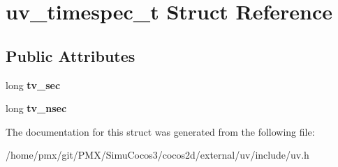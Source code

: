 \hypertarget{structuv__timespec__t}{}\section{uv\+\_\+timespec\+\_\+t Struct Reference}
\label{structuv__timespec__t}
\subsection*{Public Attributes}
\begin{DoxyCompactItemize}
\item 
\mbox{\label{structuv__timespec__t_a6c1e6a2cd2d9f10dc4df27ab3a79bc9d}} 
long {\bfseries tv\+\_\+sec}
\item 
\mbox{\label{structuv__timespec__t_af1552c618f27286c9734be801d0ecf3f}} 
long {\bfseries tv\+\_\+nsec}
\end{DoxyCompactItemize}


The documentation for this struct was generated from the following file\+:\begin{DoxyCompactItemize}
\item 
/home/pmx/git/\+P\+M\+X/\+Simu\+Cocos3/cocos2d/external/uv/include/uv.\+h\end{DoxyCompactItemize}
